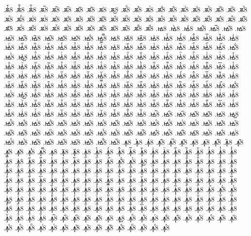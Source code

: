 {.ꙛ҆꙽8
.ꙛ҆ꚞ8
.ꙛ҆ꚟ8
.ꙛ҇8
.ꙛ᷀8
.ꙛ᷁8
.ꙛ᷶8
.ꙛ᷷8
.ꙛ᷸8
.ꙛ᷹8
.ꙛⷠ8
.ꙛⷡ8
.ꙛⷢ8
.ꙛⷣ8
.ꙛⷤ8
.ꙛⷥ8
.ꙛⷦ8
.ꙛⷧ8
.ꙛⷨ8
.ꙛⷩ8
.ꙛⷪ8
.ꙛⷫ8
.ꙛⷬ8
.ꙛⷭ8
.ꙛⷮ8
.ꙛⷯ8
.ꙛⷰ8
.ꙛⷱ8
.ꙛⷲ8
.ꙛⷳ8
.ꙛⷴ8
.ꙛⷵ8
.ꙛⷶ8
.ꙛⷷ8
.ꙛⷸ8
.ꙛⷹ8
.ꙛⷺ8
.ꙛⷻ8
.ꙛⷼ8
.ꙛⷽ8
.ꙛⷾ8
.ꙛⷿ8
.ꙛ꙯8
.ꙛꙴ8
.ꙛꙵ8
.ꙛꙶ8
.ꙛꙷ8
.ꙛꙸ8
.ꙛꙹ8
.ꙛꙺ8
.ꙛꙻ8
.ꙛ꙼8
.ꙛ꙽8
.ꙛꚞ8
.ꙛꚟ8
.ꙝ8
.ꙝ̀8
.ꙝ́8
.ꙝ̂8
.ꙝ̅8
.ꙝ̆8
.ꙝ̇8
.ꙝ̈8
.ꙝ̋8
.ꙝ̏8
.ꙝ̑8
.ꙝ̓8
.ꙝ̔8
.ꙝ̾8
.ꙝ̿8
.ꙝ͘8
.ꙝ҃8
.ꙝ҄8
.ꙝ҅8
.ꙝ҅̀8
.ꙝ҅́8
.ꙝ҅̂8
.ꙝ҅̅8
.ꙝ҅̆8
.ꙝ҅̇8
.ꙝ҅̈8
.ꙝ҅̋8
.ꙝ҅̏8
.ꙝ҅̑8
.ꙝ҅̓8
.ꙝ҅̔8
.ꙝ҅̾8
.ꙝ҅̿8
.ꙝ҅͘8
.ꙝ҅҃8
.ꙝ҅҄8
.ꙝ҅҅8
.ꙝ҅҆8
.ꙝ҅҇8
.ꙝ҅᷀8
.ꙝ҅᷁8
.ꙝ҅᷶8
.ꙝ᷷҅8
.ꙝ᷸҅8
.ꙝ᷹҅8
.ꙝ҅ⷠ8
.ꙝ҅ⷡ8
.ꙝ҅ⷢ8
.ꙝ҅ⷣ8
.ꙝ҅ⷤ8
.ꙝ҅ⷥ8
.ꙝ҅ⷦ8
.ꙝ҅ⷧ8
.ꙝ҅ⷨ8
.ꙝ҅ⷩ8
.ꙝ҅ⷪ8
.ꙝ҅ⷫ8
.ꙝ҅ⷬ8
.ꙝ҅ⷭ8
.ꙝ҅ⷮ8
.ꙝ҅ⷯ8
.ꙝ҅ⷰ8
.ꙝ҅ⷱ8
.ꙝ҅ⷲ8
.ꙝ҅ⷳ8
.ꙝ҅ⷴ8
.ꙝ҅ⷵ8
.ꙝ҅ⷶ8
.ꙝ҅ⷷ8
.ꙝ҅ⷸ8
.ꙝ҅ⷹ8
.ꙝ҅ⷺ8
.ꙝ҅ⷻ8
.ꙝ҅ⷼ8
.ꙝ҅ⷽ8
.ꙝ҅ⷾ8
.ꙝ҅ⷿ8
.ꙝ҅꙯8
.ꙝ҅ꙴ8
.ꙝ҅ꙵ8
.ꙝ҅ꙶ8
.ꙝ҅ꙷ8
.ꙝ҅ꙸ8
.ꙝ҅ꙹ8
.ꙝ҅ꙺ8
.ꙝ҅ꙻ8
.ꙝ҅꙼8
.ꙝ҅꙽8
.ꙝ҅ꚞ8
.ꙝ҅ꚟ8
.ꙝ҆8
.ꙝ҆̀8
.ꙝ҆́8
.ꙝ҆̂8
.ꙝ҆̅8
.ꙝ҆̆8
.ꙝ҆̇8
.ꙝ҆̈8
.ꙝ҆̋8
.ꙝ҆̏8
.ꙝ҆̑8
.ꙝ҆̓8
.ꙝ҆̔8
.ꙝ҆̾8
.ꙝ҆̿8
.ꙝ҆͘8
.ꙝ҆҃8
.ꙝ҆҄8
.ꙝ҆҅8
.ꙝ҆҆8
.ꙝ҆҇8
.ꙝ҆᷀8
.ꙝ҆᷁8
.ꙝ҆᷶8
.ꙝ᷷҆8
.ꙝ᷸҆8
.ꙝ᷹҆8
.ꙝ҆ⷠ8
.ꙝ҆ⷡ8
.ꙝ҆ⷢ8
.ꙝ҆ⷣ8
.ꙝ҆ⷤ8
.ꙝ҆ⷥ8
.ꙝ҆ⷦ8
.ꙝ҆ⷧ8
.ꙝ҆ⷨ8
.ꙝ҆ⷩ8
.ꙝ҆ⷪ8
.ꙝ҆ⷫ8
.ꙝ҆ⷬ8
.ꙝ҆ⷭ8
.ꙝ҆ⷮ8
.ꙝ҆ⷯ8
.ꙝ҆ⷰ8
.ꙝ҆ⷱ8
.ꙝ҆ⷲ8
.ꙝ҆ⷳ8
.ꙝ҆ⷴ8
.ꙝ҆ⷵ8
.ꙝ҆ⷶ8
.ꙝ҆ⷷ8
.ꙝ҆ⷸ8
.ꙝ҆ⷹ8
.ꙝ҆ⷺ8
.ꙝ҆ⷻ8
.ꙝ҆ⷼ8
.ꙝ҆ⷽ8
.ꙝ҆ⷾ8
.ꙝ҆ⷿ8
.ꙝ҆꙯8
.ꙝ҆ꙴ8
.ꙝ҆ꙵ8
.ꙝ҆ꙶ8
.ꙝ҆ꙷ8
.ꙝ҆ꙸ8
.ꙝ҆ꙹ8
.ꙝ҆ꙺ8
.ꙝ҆ꙻ8
.ꙝ҆꙼8
.ꙝ҆꙽8
.ꙝ҆ꚞ8
.ꙝ҆ꚟ8
.ꙝ҇8
.ꙝ᷀8
.ꙝ᷁8
.ꙝ᷶8
.ꙝ᷷8
.ꙝ᷸8
.ꙝ᷹8
.ꙝⷠ8
.ꙝⷡ8
.ꙝⷢ8
.ꙝⷣ8
.ꙝⷤ8
.ꙝⷥ8
.ꙝⷦ8
.ꙝⷧ8
.ꙝⷨ8
.ꙝⷩ8
.ꙝⷪ8
.ꙝⷫ8
.ꙝⷬ8
.ꙝⷭ8
.ꙝⷮ8
.ꙝⷯ8
.ꙝⷰ8
.ꙝⷱ8
.ꙝⷲ8
.ꙝⷳ8
.ꙝⷴ8
.ꙝⷵ8
.ꙝⷶ8
.ꙝⷷ8
.ꙝⷸ8
.ꙝⷹ8
.ꙝⷺ8
.ꙝⷻ8
.ꙝⷼ8
.ꙝⷽ8
.ꙝⷾ8
.ꙝⷿ8
.ꙝ꙯8
.ꙝꙴ8
.ꙝꙵ8
.ꙝꙶ8
.ꙝꙷ8
.ꙝꙸ8
.ꙝꙹ8
.ꙝꙺ8
.ꙝꙻ8
.ꙝ꙼8
.ꙝ꙽8
.ꙝꚞ8
.ꙝꚟ8
.ꙟ8
.ꙟ̀8
.ꙟ́8
.ꙟ̂8
.ꙟ̅8
.ꙟ̆8
.ꙟ̇8
.ꙟ̈8
.ꙟ̋8
.ꙟ̏8
.ꙟ̑8
.ꙟ̓8
.ꙟ̔8
.ꙟ̾8
.ꙟ̿8
.ꙟ͘8
.ꙟ҃8
.ꙟ҄8
.ꙟ҅8
.ꙟ҅̀8
.ꙟ҅́8
.ꙟ҅̂8
.ꙟ҅̅8
.ꙟ҅̆8
.ꙟ҅̇8
.ꙟ҅̈8
.ꙟ҅̋8
.ꙟ҅̏8
.ꙟ҅̑8
.ꙟ҅̓8
.ꙟ҅̔8
.ꙟ҅̾8
.ꙟ҅̿8
.ꙟ҅͘8
.ꙟ҅҃8
.ꙟ҅҄8
.ꙟ҅҅8
.ꙟ҅҆8
.ꙟ҅҇8
.ꙟ҅᷀8
.ꙟ҅᷁8
.ꙟ҅᷶8
.ꙟ᷷҅8
.ꙟ᷸҅8
.ꙟ᷹҅8
.ꙟ҅ⷠ8
.ꙟ҅ⷡ8
.ꙟ҅ⷢ8
.ꙟ҅ⷣ8
.ꙟ҅ⷤ8
.ꙟ҅ⷥ8
.ꙟ҅ⷦ8
.ꙟ҅ⷧ8
.ꙟ҅ⷨ8
.ꙟ҅ⷩ8
.ꙟ҅ⷪ8
.ꙟ҅ⷫ8
.ꙟ҅ⷬ8
.ꙟ҅ⷭ8
.ꙟ҅ⷮ8
.ꙟ҅ⷯ8
.ꙟ҅ⷰ8
.ꙟ҅ⷱ8
.ꙟ҅ⷲ8
.ꙟ҅ⷳ8
.ꙟ҅ⷴ8
.ꙟ҅ⷵ8
.ꙟ҅ⷶ8
.ꙟ҅ⷷ8
.ꙟ҅ⷸ8
.ꙟ҅ⷹ8
.ꙟ҅ⷺ8
.ꙟ҅ⷻ8
.ꙟ҅ⷼ8
.ꙟ҅ⷽ8
.ꙟ҅ⷾ8
.ꙟ҅ⷿ8
.ꙟ҅꙯8
.ꙟ҅ꙴ8
.ꙟ҅ꙵ8
.ꙟ҅ꙶ8
.ꙟ҅ꙷ8
.ꙟ҅ꙸ8
.ꙟ҅ꙹ8
.ꙟ҅ꙺ8
.ꙟ҅ꙻ8
.ꙟ҅꙼8
.ꙟ҅꙽8
.ꙟ҅ꚞ8
.ꙟ҅ꚟ8
.ꙟ҆8
.ꙟ҆̀8
.ꙟ҆́8
.ꙟ҆̂8
.ꙟ҆̅8
.ꙟ҆̆8
.ꙟ҆̇8
.ꙟ҆̈8
.ꙟ҆̋8
.ꙟ҆̏8
.ꙟ҆̑8
.ꙟ҆̓8
.ꙟ҆̔8
.ꙟ҆̾8
.ꙟ҆̿8
.ꙟ҆͘8
.ꙟ҆҃8
.ꙟ҆҄8
.ꙟ҆҅8
.ꙟ҆҆8
.ꙟ҆҇8
.ꙟ҆᷀8
.ꙟ҆᷁8
.ꙟ҆᷶8
.ꙟ᷷҆8
.ꙟ᷸҆8
.ꙟ᷹҆8
.ꙟ҆ⷠ8
.ꙟ҆ⷡ8
.ꙟ҆ⷢ8
.ꙟ҆ⷣ8
.ꙟ҆ⷤ8
.ꙟ҆ⷥ8
.ꙟ҆ⷦ8
.ꙟ҆ⷧ8
.ꙟ҆ⷨ8
.ꙟ҆ⷩ8
.ꙟ҆ⷪ8
.ꙟ҆ⷫ8
.ꙟ҆ⷬ8
.ꙟ҆ⷭ8
.ꙟ҆ⷮ8
.ꙟ҆ⷯ8
.ꙟ҆ⷰ8
.ꙟ҆ⷱ8
.ꙟ҆ⷲ8
.ꙟ҆ⷳ8
.ꙟ҆ⷴ8
.ꙟ҆ⷵ8
.ꙟ҆ⷶ8
.ꙟ҆ⷷ8
.ꙟ҆ⷸ8
.ꙟ҆ⷹ8
.ꙟ҆ⷺ8
.ꙟ҆ⷻ8
.ꙟ҆ⷼ8
.ꙟ҆ⷽ8
.ꙟ҆ⷾ8
.ꙟ҆ⷿ8
.ꙟ҆꙯8
.ꙟ҆ꙴ8
.ꙟ҆ꙵ8
.ꙟ҆ꙶ8
.ꙟ҆ꙷ8
.ꙟ҆ꙸ8
.ꙟ҆ꙹ8
.ꙟ҆ꙺ8
.ꙟ҆ꙻ8
.ꙟ҆꙼8
.ꙟ҆꙽8
.ꙟ҆ꚞ8
.ꙟ҆ꚟ8
.ꙟ҇8
.ꙟ᷀8
.ꙟ᷁8
.ꙟ᷶8
.ꙟ᷷8
.ꙟ᷸8
.ꙟ᷹8
.ꙟⷠ8
.ꙟⷡ8
.ꙟⷢ8
.ꙟⷣ8
.ꙟⷤ8
.ꙟⷥ8
.ꙟⷦ8
.ꙟⷧ8
.ꙟⷨ8
.ꙟⷩ8
.ꙟⷪ8
.ꙟⷫ8
.ꙟⷬ8
.ꙟⷭ8
.ꙟⷮ8
.ꙟⷯ8
.ꙟⷰ8
.ꙟⷱ8
.ꙟⷲ8
.ꙟⷳ8
.ꙟⷴ8
.ꙟⷵ8
.ꙟⷶ8
.ꙟⷷ8
.ꙟⷸ8
}
